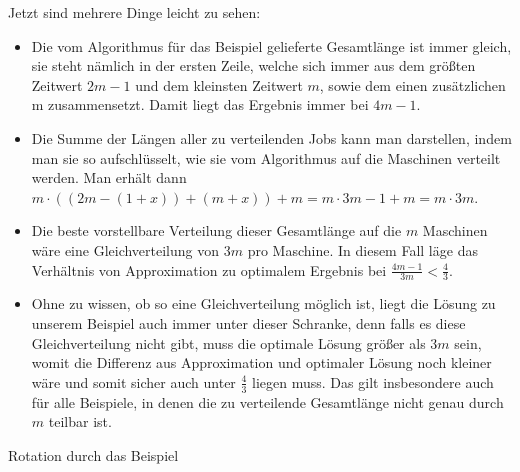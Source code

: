 \documentclass[a4paper]{article}
\begin{document}
Jetzt sind mehrere Dinge leicht zu sehen:
\begin{itemize}
\item Die vom Algorithmus für das Beispiel gelieferte Gesamtlänge ist immer gleich, sie steht nämlich in der ersten Zeile, welche sich immer aus dem größten Zeitwert $2m-1$ und dem kleinsten Zeitwert $m$, sowie dem einen zusätzlichen m zusammensetzt. Damit liegt das Ergebnis immer bei $4m-1$.

\item Die Summe der Längen aller zu verteilenden Jobs kann man darstellen, indem man sie so aufschlüsselt, wie sie vom Algorithmus auf die Maschinen verteilt werden. Man erhält dann $m \cdot ((2m-(1 + x)) + (m + x)) + m = m \cdot 3m-1 + m = m \cdot 3m$.

\item Die beste vorstellbare Verteilung dieser Gesamtlänge auf die $m$ Maschinen wäre eine Gleichverteilung von $3m$ pro Maschine. In diesem Fall läge das Verhältnis von Approximation zu optimalem Ergebnis bei $\frac{4m -1}{3m} < \frac{4}{3}$. 

\item Ohne zu wissen, ob so eine Gleichverteilung möglich ist, liegt die Lösung zu unserem Beispiel auch immer unter dieser Schranke, denn falls es diese Gleichverteilung nicht gibt, muss die optimale Lösung größer als $3m$ sein, womit die Differenz aus Approximation und optimaler Lösung noch kleiner wäre und somit sicher auch unter $\frac{4}{3}$ liegen muss. Das gilt insbesondere auch für alle Beispiele, in denen die zu verteilende Gesamtlänge nicht genau durch $m$ teilbar ist.
\end{itemize}

	Rotation durch das Beispiel
	
\end{document}
